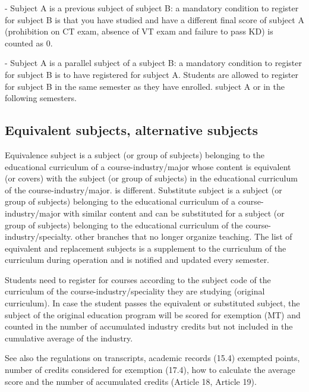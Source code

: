 - Subject A is a previous subject of subject B: a mandatory condition to register for subject B is that you have studied and have a different final score of subject A (prohibition on CT exam, absence of VT exam and failure to pass KD) is counted as 0.

- Subject A is a parallel subject of a subject B: a mandatory condition to register for subject B is to have registered for subject A. Students are allowed to register for subject B in the same semester as they have enrolled. subject A or in the following semesters.

\subsection{Equivalent subjects, alternative subjects}
Equivalence subject is a subject (or group of subjects) belonging to the educational curriculum of a course-industry/major whose content is equivalent (or covers) with the subject (or group of subjects) in the educational curriculum of the course-industry/major. is different. Substitute subject is a subject (or group of subjects) belonging to the educational curriculum of a course-industry/major with similar content and can be substituted for a subject (or group of subjects) belonging to the educational curriculum of the course-industry/specialty. other branches that no longer organize teaching. The list of equivalent and replacement subjects is a supplement to the curriculum of the curriculum during operation and is notified and updated every semester.

Students need to register for courses according to the subject code of the curriculum of the course-industry/speciality they are studying (original curriculum). In case the student passes the equivalent or substituted subject, the subject of the original education program will be scored for exemption (MT) and counted in the number of accumulated industry credits but not included in the cumulative average of the industry.

See also the regulations on transcripts, academic records (15.4) exempted points, number of credits considered for exemption (17.4), how to calculate the average score and the number of accumulated credits (Article 18, Article 19).